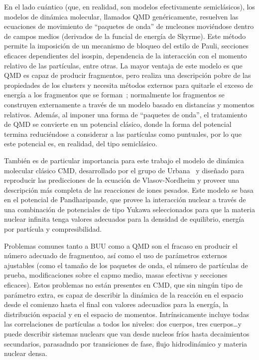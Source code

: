 En el lado cuántico (que, en realidad, son modelos efectivamente semiclásicos), los modelos de dinámica molecular, llamados QMD genéricamente, resuelven las ecuaciones de movimiento de ``paquetes de onda'' de nucleones moviéndose dentro de campos medios (derivados de la funcial de energía de Skyrme).
Este método permite la imposición de un mecanismo de bloqueo del estilo de Pauli, secciones eficaces dependientes del isospin, dependencia de la interacción con el momento relativo de las partículas, entre otras.
La mayor ventaja de este modelo es que QMD es capaz de producir fragmentos, pero realiza una descripción pobre de las propiedades de los clusters y necesita métodos externos para quitarle el exceso de energía a los fragmentos que se forman~\cite{polanski_development_2005};
normalmente los fragmentos se construyen externamente a través de un modelo basado en distancias y momentos relativos.
Además, al imponer una forma de ``paquetes de onda'', el tratamiento de QMD se convierte en un potencial clásico, donde la forma del potencial termina reduciéndose a considerar a las partículas como puntuales, por lo que este potencial es, en realidad, del tipo semiclásico.

También es de particular importancia para este trabajo el modelo de dinámica molecular clásico CMD, desarrollado por el grupo de Urbana~\cite{lenk_accuracy_1990} y diseñado para reproducir las predicciones de la ecuación de Vlasov-Nordheim y proveer una descripción más completa de las reacciones de iones pesados.
Este modelo se basa en el potencial de Pandharipande, que provee la interacción nuclear a través de una combinación de potenciales de tipo Yukawa seleccionados para que la materia nuclear infinita tenga valores adecuados para la densidad de equilibrio, energía por partícula y compresibilidad.

Problemas comunes tanto a BUU como a QMD son el fracaso en producir el número adecuado de fragmentoo, así como el uso de parámetros externos ajustables (como el tamaño de los paquetes de onda, el número de partículas de prueba, modificaciones sobre el capmo medio, masas efectivas y secciones eficaces).
Estos problemas no están presentes en CMD, que sin ningún tipo de parámetro extra, es capaz de describir la dinámica de la reacción en el espacio desde el comienzo hasta el final con valores adecuadios para la energía, la distribución espacial y en el espacio de momentos.
Intrínsicamente incluye todas las correlaciones de partículas a todos los niveles: dos cuerpos, tres cuerpos\ldots y puede describir sistemas nuclears que van desde nucleos fríos hasta decaimientos secundarios, parasadndo por transiciones de fase, flujo hidrodinámico y materia nuclear densa.

